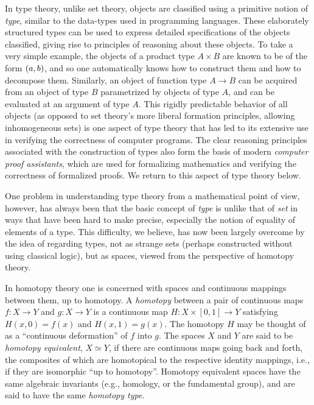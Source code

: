 In type theory, unlike set theory, objects are classified using a primitive notion of \emph{type}, similar to the data-types used in programming languages.  These elaborately structured types can be used to express detailed specifications of the objects classified, giving rise to principles of reasoning about these objects.  To take a very simple example, the objects of a product type $A\times B$ are known to be of the form ${\mathopen{}(a,b)\mathclose{}}$, and so one automatically knows how to construct them and how to decompose them. Similarly, an object of function type $A\to B$ can be acquired from an object of type $B$ parametrized by objects of type $A$, and can be evaluated at an argument of type $A$.  This rigidly predictable behavior of all objects (as opposed to set theory's more liberal formation principles, allowing inhomogeneous sets) is one aspect of type theory that has led to its extensive use in verifying the correctness of computer programs.  The clear reasoning principles associated with the construction of types also form the basis of modern \emph{computer proof assistants}, which are used for formalizing mathematics and verifying the correctness of formalized proofs.  We return to this aspect of type theory below.  

One problem in understanding type theory from a mathematical point of view, however, has always been that the basic concept of \emph{type} is unlike that of \emph{set} in ways that have been hard to make precise, especially the notion of equality of elements of a type.  This difficulty, we believe, has now been largely overcome by the idea of regarding types, not as strange sets (perhaps constructed without using classical logic), but as spaces, viewed from the perspective of homotopy theory. 

In homotopy theory one is concerned with spaces and continuous mappings between them, 
up to homotopy.  A \emph{homotopy} between a pair of continuous maps $f \colon X \to Y$
and  $g \colon X\to Y$ is 
a continuous map $H \colon X \times [0, 1] \to Y$ satisfying
$H(x, 0) = f (x)$  and $H(x, 1) = g(x)$. The homotopy $H$ may be thought of as a ``continuous deformation'' of $f$ into $g$. The spaces $X$ and $Y$ are said to be \emph{homotopy equivalent}, $X\simeq Y$, if there are continuous maps going back and forth, the composites of which are homotopical to the respective identity mappings, i.e., if they are isomorphic ``up to homotopy''.  Homotopy equivalent spaces have the same algebraic invariants (e.g., homology, or the fundamental group), and are said to have the same \emph{homotopy type}.

